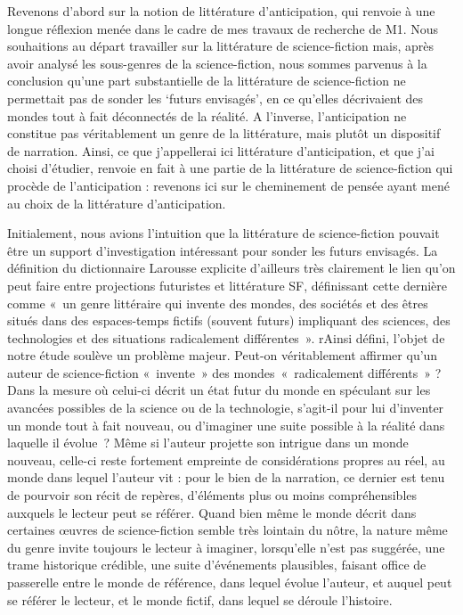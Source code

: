 \documentclass[letterpaper,portrait,12pt]{article}
\begin{document}
\textbf{	}Revenons d'abord sur la notion de litt\'{e}rature d'anticipation, qui renvoie \`{a} une longue r\'{e}flexion men\'{e}e dans le cadre de mes travaux de recherche de M1. Nous souhaitions au d\'{e}part travailler sur la litt\'{e}rature de science-fiction mais, apr\`{e}s avoir analys\'{e} les sous-genres de la science-fiction, nous sommes parvenus \`{a} la conclusion qu'une part substantielle de la litt\'{e}rature de science-fiction ne permettait pas de sonder les {`}futurs envisag\'{e}s', en ce qu'elles d\'{e}crivaient des mondes tout \`{a} fait d\'{e}connect\'{e}s de la r\'{e}alit\'{e}. A l'inverse, l'anticipation ne constitue pas v\'{e}ritablement un genre de la litt\'{e}rature, mais plut\^{o}t un dispositif de narration. Ainsi, ce que j'appellerai ici litt\'{e}rature d'anticipation, et que j'ai choisi d'\'{e}tudier, renvoie en fait \`{a} une partie de la litt\'{e}rature de science-fiction qui proc\`{e}de de l'anticipation : revenons ici sur le cheminement de pens\'{e}e ayant men\'{e} au choix de la litt\'{e}rature d'anticipation.





	Initialement, nous avions l'intuition que la litt\'{e}rature de science-fiction pouvait \^{e}tre un support d'investigation int\'{e}ressant pour sonder les futurs envisag\'{e}s. La d\'{e}finition du dictionnaire Larousse explicite d'ailleurs tr\`{e}s clairement le lien qu'on peut faire entre projections futuristes et litt\'{e}rature SF, d\'{e}finissant cette derni\`{e}re comme « un genre litt\'{e}raire qui invente des mondes, des soci\'{e}t\'{e}s et des \^{e}tres situ\'{e}s dans des espaces-temps fictifs (souvent futurs) impliquant des sciences, des technologies et des situations radicalement diff\'{e}rentes ». rAinsi d\'{e}fini, l'objet de notre \'{e}tude soul\`{e}ve un probl\`{e}me majeur. Peut-on v\'{e}ritablement affirmer qu'un auteur de science-fiction « invente » des mondes « radicalement diff\'{e}rents » ? Dans la mesure où celui-ci d\'{e}crit un \'{e}tat futur du monde en sp\'{e}culant sur les avanc\'{e}es possibles de la science ou de la technologie, s'agit-il pour lui d'inventer un monde tout \`{a} fait nouveau, ou d'imaginer une suite possible \`{a} la r\'{e}alit\'{e} dans laquelle il \'{e}volue ? M\^{e}me si l'auteur projette son intrigue dans un monde nouveau, celle-ci reste fortement empreinte de consid\'{e}rations propres au r\'{e}el, au monde dans lequel l'auteur vit : pour le bien de la narration, ce dernier est tenu de pourvoir son r\'{e}cit de rep\`{e}res, d'\'{e}l\'{e}ments plus ou moins compr\'{e}hensibles auxquels le lecteur peut se r\'{e}f\'{e}rer. Quand bien m\^{e}me le monde d\'{e}crit dans certaines \oe{}uvres de science-fiction semble tr\`{e}s lointain du n\^{o}tre, la nature m\^{e}me du genre invite toujours le lecteur \`{a} imaginer, lorsqu'elle n'est pas sugg\'{e}r\'{e}e, une trame historique cr\'{e}dible, une suite d'\'{e}v\'{e}nements plausibles, faisant office de passerelle entre le monde de r\'{e}f\'{e}rence, dans lequel \'{e}volue l'auteur, et auquel peut se r\'{e}f\'{e}rer le lecteur,\textbf{ }et le monde fictif, dans lequel se d\'{e}roule l'histoire.
\end{document}
